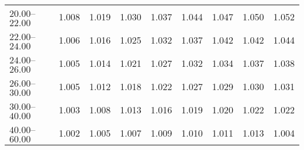 \begin{table}[htp]
\begin{tiny}
\begin{center}
\begin{tabular}{|l|c|c|c|c|c|c|c|c|}
$20.00$--$22.00$ & 1.008 & 1.019 & 1.030 & 1.037 & 1.044 & 1.047 & 1.050 & 1.052  \\
$22.00$--$24.00$ & 1.006 & 1.016 & 1.025 & 1.032 & 1.037 & 1.042 & 1.042 & 1.044  \\
$24.00$--$26.00$ & 1.005 & 1.014 & 1.021 & 1.027 & 1.032 & 1.034 & 1.037 & 1.038  \\
$26.00$--$30.00$ & 1.005 & 1.012 & 1.018 & 1.022 & 1.027 & 1.029 & 1.030 & 1.031  \\
$30.00$--$40.00$ & 1.003 & 1.008 & 1.013 & 1.016 & 1.019 & 1.020 & 1.022 & 1.022  \\
$40.00$--$60.00$ & 1.002 & 1.005 & 1.007 & 1.009 & 1.010 & 1.011 & 1.013 & 1.004  \\
\hline
\end{tabular} 
             \end{center} 
             \end{tiny} 
             \label{tab:sa_offP_psi2s} 
             \end{table}


